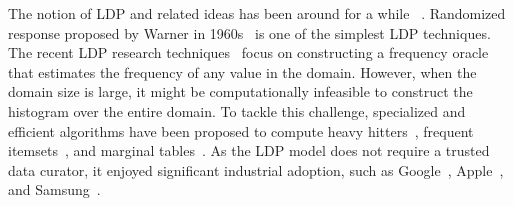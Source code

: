 The notion of \textsf{LDP} and related ideas has been around for a while ~\cite{Kasivi,Evfimievski:2003:LPB:773153.773174,RR}. Randomized response proposed by Warner in 1960s~\cite{RR} is one of the simplest \textsf{LDP} techniques. The recent \textsf{LDP} research techniques~\cite{LDP1, LDP2, Rappor1} focus on constructing a frequency oracle that estimates the frequency of any value in the domain. However, when the domain size is large, it might be computationally infeasible to construct the histogram over the entire domain. To tackle this challenge, specialized and efficient algorithms have been proposed to compute heavy hitters~\cite{HH,Rappor2,HH2}, frequent itemsets~\cite{15,itemset}, and marginal tables~\cite{Cormode, CALM}. As the \textsf{LDP} model does not require a trusted data curator, it enjoyed significant industrial adoption, such as Google~\cite{Rappor1, Rappor2}, Apple~\cite{Apple}, and Samsung~\cite{Samsung}.



